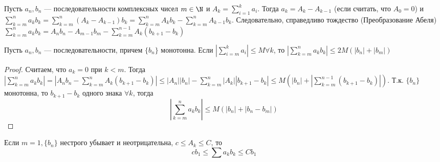 
Пусть $a_n, b_n$ --- последовательности комплексных чисел $m \in \N$ и $A_k = \sum_{i = 1}^{k} a_i$. Тогда $a_k = A_k - A_{k-1}$ (если считать, что $A_0 = 0$) и $\sum_{k = m}^{n}a_kb_k = \sum_{k = m}^{n}(A_k - A_{k-1})b_k = \sum_{k = m}^{n}A_kb_k - \sum_{k = m}^{n}A_{k-1}b_k$.
Следовательно, справедливо тождество (Преобразование Абеля) $\sum_{k = m}^{n}a_kb_k = A_nb_n - A_{m-1}b_m - \sum_{k = m}^{n - 1}A_k(b_{k+1} - b_k)$
\begin{lemma}[Абеля]
    Пусть $a_n, b_n$ --- последовательности, причем $\{b_n\}$ монотонна. Если $\left\lvert \sum_{i = m}^k a_i\right\rvert \le M \forall k$, то $\left\lvert \sum_{k = m}^{n}a_kb_k\right\rvert \le 2M(|b_n| + |b_m|)$
\end{lemma}
\begin{proof}
    Считаем, что $a_k = 0$ при $k < m$. Тогда $\left\lvert \sum_{k = m}^{n}a_kb_k\right\rvert = \left\lvert A_nb_n - \sum_{k = m}^{n}A_k(b_{k+1} - b_k)\right\rvert \le |A_n||b_n| - \sum_{k = m}^{n}|A_k||b_{k+1} - b_k| \le M(|b_n| + \left\lvert \sum_{k = m}^{n-1}(b_{k+1} - b_k)\right\rvert )$. Т.к. $\{b_n\}$ монотонна, то $b_{k+1} - b_k$ одного знака $\forall k$, тогда 
    $$\left\lvert \sum_{k = m}^{n}a_kb_k\right\rvert \le M(|b_n| + |b_n - b_{m}|)$$
\end{proof}

\begin{note}
    Если $m = 1, \{b_n\}$ нестрого убывает и неотрицательна, $c \le A_k \le C$, то 
    $$cb_1 \le \sum a_kb_k \le Cb_1$$
\end{note}

